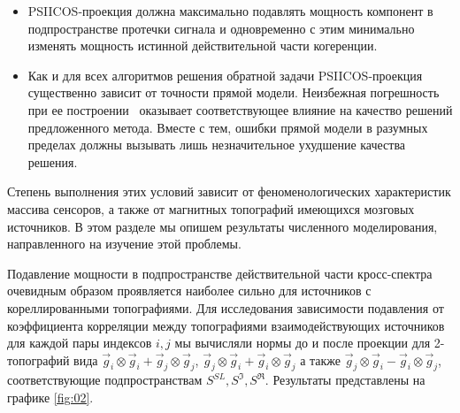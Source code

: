 \begin{itemize}
    \item PSIICOS-проекция должна максимально подавлять мощность компонент в подпространстве
        протечки сигнала и одновременно с этим минимально изменять мощность истинной
        действительной части когеренции.
    \item Как и для всех алгоритмов решения обратной задачи PSIICOS-проекция существенно
        зависит от точности прямой модели. Неизбежная погрешность при ее
        построении~\cite{Mosher1999} оказывает соответствующее влияние на качество решений
        предложенного метода. Вместе с тем, ошибки прямой модели в разумных пределах должны
        вызывать лишь незначительное ухудшение качества решения.
\end{itemize}

Степень выполнения этих условий зависит от феноменологических характеристик массива сенсоров,
а также от магнитных топографий имеющихся мозговых источников. В этом разделе мы
опишем результаты численного моделирования, направленного на изучение этой проблемы.

Подавление мощности в подпространстве действительной части кросс-спектра
очевидным образом проявляется наиболее сильно для источников с кореллированными
топографиями.  Для исследования зависимости подавления от коэффициента
корреляции между топографиями взаимодействующих источников для каждой пары
индексов $i, j$ мы вычисляли нормы до и после проекции для 2-топографий вида
$\vec{g}_i \otimes \vec{g}_i + \vec{g}_j \otimes \vec{g}_j$,
$\vec{g}_j\otimes\vec{g}_i + \vec{g}_i\otimes\vec{g}_j$ а также
$\vec{g}_j\otimes\vec{g}_i - \vec{g}_i\otimes\vec{g}_j$, соответствующие
подпространствам $S^{SL}, S^{\Im}, S^{\Re}$. Результаты представлены на графике
\ref{fig:02}.

